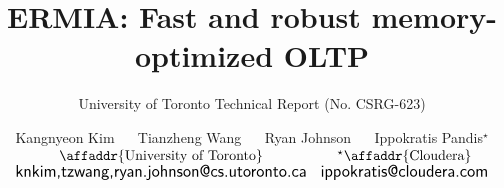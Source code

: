\documentclass{../common/techrpt}
\def\thepapertitle{ERMIA: Fast and robust memory-optimized OLTP}
\begin{document}
\title{\thepapertitle}
\subtitle{\sf \fontsize{11}{11} \selectfont University of Toronto Technical Report (No. CSRG-623)}
\author{
\alignauthor
Kangnyeon Kim
~~
Tianzheng Wang
~~
Ryan Johnson
~~
Ippokratis Pandis$^\star$
\bigskip\\
$
\begin{array}{cc}
  \mbox{\affaddr{University of Toronto}} &
  \mbox{$^\star$\affaddr{Cloudera}}\\
  \mbox{{\large \sf {knkim,tzwang,ryan.johnson}@cs.utoronto.ca}} &
  \mbox{{\large \sf ippokratis@cloudera.com}}
\end{array}
$
\\
}

\maketitle











{\small %

}

\end{document}
